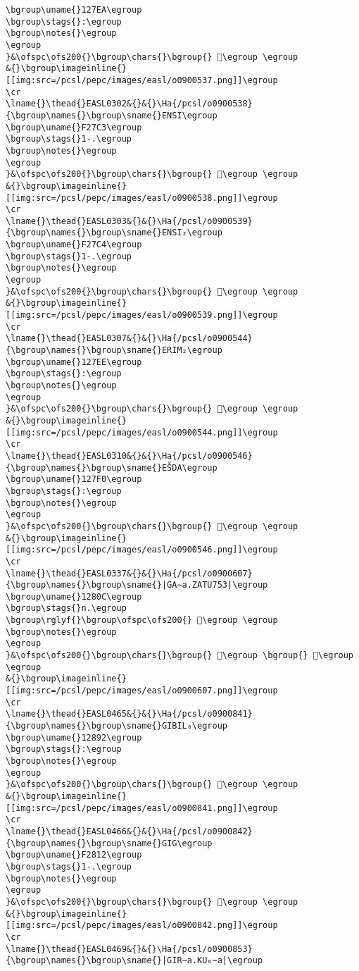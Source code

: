 \begin{verbatim}
\bgroup\uname{}127EA\egroup
\bgroup\stags{}:\egroup
\bgroup\notes{}\egroup
\egroup
}&\ofspc\ofs200{}\bgroup\chars{}\bgroup{} 𒟪\egroup \egroup
&{}\bgroup\imageinline{}[[img:src=/pcsl/pepc/images/easl/o0900537.png]]\egroup
\cr
\lname{}\thead{}EASL0302&{}&{}\Ha{/pcsl/o0900538}{\bgroup\names{}\bgroup\sname{}ENSI\egroup
\bgroup\uname{}F27C3\egroup
\bgroup\stags{}1-.\egroup
\bgroup\notes{}\egroup
\egroup
}&\ofspc\ofs200{}\bgroup\chars{}\bgroup{} 󲟃\egroup \egroup
&{}\bgroup\imageinline{}[[img:src=/pcsl/pepc/images/easl/o0900538.png]]\egroup
\cr
\lname{}\thead{}EASL0303&{}&{}\Ha{/pcsl/o0900539}{\bgroup\names{}\bgroup\sname{}ENSI₂\egroup
\bgroup\uname{}F27C4\egroup
\bgroup\stags{}1-.\egroup
\bgroup\notes{}\egroup
\egroup
}&\ofspc\ofs200{}\bgroup\chars{}\bgroup{} 󲟄\egroup \egroup
&{}\bgroup\imageinline{}[[img:src=/pcsl/pepc/images/easl/o0900539.png]]\egroup
\cr
\lname{}\thead{}EASL0307&{}&{}\Ha{/pcsl/o0900544}{\bgroup\names{}\bgroup\sname{}ERIM₂\egroup
\bgroup\uname{}127EE\egroup
\bgroup\stags{}:\egroup
\bgroup\notes{}\egroup
\egroup
}&\ofspc\ofs200{}\bgroup\chars{}\bgroup{} 𒟮\egroup \egroup
&{}\bgroup\imageinline{}[[img:src=/pcsl/pepc/images/easl/o0900544.png]]\egroup
\cr
\lname{}\thead{}EASL0310&{}&{}\Ha{/pcsl/o0900546}{\bgroup\names{}\bgroup\sname{}EŠDA\egroup
\bgroup\uname{}127F0\egroup
\bgroup\stags{}:\egroup
\bgroup\notes{}\egroup
\egroup
}&\ofspc\ofs200{}\bgroup\chars{}\bgroup{} 𒟰\egroup \egroup
&{}\bgroup\imageinline{}[[img:src=/pcsl/pepc/images/easl/o0900546.png]]\egroup
\cr
\lname{}\thead{}EASL0337&{}&{}\Ha{/pcsl/o0900607}{\bgroup\names{}\bgroup\sname{}|GA∼a.ZATU753|\egroup
\bgroup\uname{}1280C\egroup
\bgroup\stags{}n.\egroup
\bgroup\rglyf{}\bgroup\ofspc\ofs200{} 𒠌\egroup \egroup
\bgroup\notes{}\egroup
\egroup
}&\ofspc\ofs200{}\bgroup\chars{}\bgroup{} 𒠌\egroup \bgroup{} 𒠐\egroup \egroup
&{}\bgroup\imageinline{}[[img:src=/pcsl/pepc/images/easl/o0900607.png]]\egroup
\cr
\lname{}\thead{}EASL0465&{}&{}\Ha{/pcsl/o0900841}{\bgroup\names{}\bgroup\sname{}GIBIL₆\egroup
\bgroup\uname{}12892\egroup
\bgroup\stags{}:\egroup
\bgroup\notes{}\egroup
\egroup
}&\ofspc\ofs200{}\bgroup\chars{}\bgroup{} 𒢒\egroup \egroup
&{}\bgroup\imageinline{}[[img:src=/pcsl/pepc/images/easl/o0900841.png]]\egroup
\cr
\lname{}\thead{}EASL0466&{}&{}\Ha{/pcsl/o0900842}{\bgroup\names{}\bgroup\sname{}GIG\egroup
\bgroup\uname{}F2812\egroup
\bgroup\stags{}1-.\egroup
\bgroup\notes{}\egroup
\egroup
}&\ofspc\ofs200{}\bgroup\chars{}\bgroup{} 󲠒\egroup \egroup
&{}\bgroup\imageinline{}[[img:src=/pcsl/pepc/images/easl/o0900842.png]]\egroup
\cr
\lname{}\thead{}EASL0469&{}&{}\Ha{/pcsl/o0900853}{\bgroup\names{}\bgroup\sname{}|GIR∼a.KU₆∼a|\egroup

\end{verbatim}
